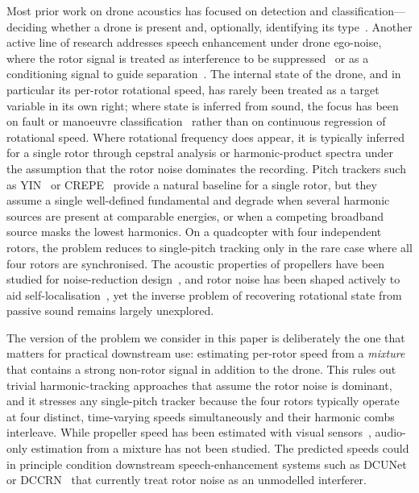 \documentclass{QD_2026}
\begin{document}
Most prior work on drone acoustics has focused on detection and
classification---deciding whether a drone is present and, optionally, identifying
its type~\cite{wang2019rpm,garcia2025multiclass}. Another active line of research addresses speech enhancement under drone ego-noise, where the rotor signal is treated as interference to be suppressed~\cite{mukhutdinov2023deep,liu2025bandsplit,li2024monaural} or as a conditioning signal to guide separation~\cite{gulli2025rps}. The internal state of the drone, and in particular its per-rotor rotational speed, has rarely been treated as a target variable in its own right; where state is inferred from sound, the focus has been on fault or manoeuvre classification~\cite{kim2023sound} rather than on continuous regression of rotational speed.
Where rotational frequency does appear, it is typically inferred for a single
rotor through cepstral analysis or harmonic-product spectra under the assumption
that the rotor noise dominates the recording. Pitch trackers such as
YIN~\cite{de1990yin} or CREPE~\cite{kim2018crepe} provide a natural baseline for
a single rotor, but they assume a single well-defined fundamental and degrade
when several harmonic sources are present at comparable energies, or when a
competing broadband source masks the lowest harmonics. On a quadcopter with
four independent rotors, the problem reduces to single-pitch tracking only in
the rare case where all four rotors are synchronised. The acoustic properties of propellers have been studied for noise-reduction design~\cite{smith2025acoustic}, and rotor noise has been shaped actively to aid self-localisation~\cite{lewin2024active}, yet the inverse problem of recovering rotational state from passive sound remains largely unexplored.

The version of the problem we consider in this paper is deliberately the one
that matters for practical downstream use: estimating per-rotor speed from a
\emph{mixture} that contains a strong non-rotor signal in addition to the drone.
This rules out trivial harmonic-tracking approaches that assume the rotor noise
is dominant, and it stresses any single-pitch tracker because the four rotors
typically operate at four distinct, time-varying speeds simultaneously and their
harmonic combs interleave. While propeller speed has been estimated with visual sensors~\cite{zhang2025count}, audio-only estimation from a mixture has not been studied. The predicted speeds could in principle condition downstream speech-enhancement systems such as DCUNet~\cite{choi2018dcunet} or DCCRN~\cite{hu2020dccrn} that currently treat rotor noise as an unmodelled interferer.
\end{document}
